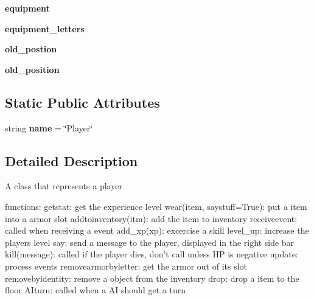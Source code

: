 \begin{DoxyCompactItemize}
\item 
\hypertarget{classplayer__input_1_1_player_object_a9ef633c704f30a24c5cdbd3718bd3533}{}{\bfseries equipment}\label{classplayer__input_1_1_player_object_a9ef633c704f30a24c5cdbd3718bd3533}

\item 
\hypertarget{classplayer__input_1_1_player_object_ae7e42b989ea422953e012e2a526c2b7b}{}{\bfseries equipment\+\_\+letters}\label{classplayer__input_1_1_player_object_ae7e42b989ea422953e012e2a526c2b7b}

\item 
\hypertarget{classplayer__input_1_1_player_object_a3a86c0496044c578bbfebb2f376f97d0}{}{\bfseries old\+\_\+postion}\label{classplayer__input_1_1_player_object_a3a86c0496044c578bbfebb2f376f97d0}

\item 
\hypertarget{classplayer__input_1_1_player_object_a061ef0101854a1d8915da9a9aaa05b81}{}{\bfseries old\+\_\+position}\label{classplayer__input_1_1_player_object_a061ef0101854a1d8915da9a9aaa05b81}

\end{DoxyCompactItemize}
\subsection*{Static Public Attributes}
\begin{DoxyCompactItemize}
\item 
\hypertarget{classplayer__input_1_1_player_object_a9250b79ae03cce6da884d59edd276a6b}{}string {\bfseries name} = \char`\"{}Player\char`\"{}\label{classplayer__input_1_1_player_object_a9250b79ae03cce6da884d59edd276a6b}

\end{DoxyCompactItemize}


\subsection{Detailed Description}
\begin{DoxyVerb}A class that represents a player

functions:
getstat: get the experience level
wear(item, saystuff=True): put a item into a armor slot
addtoinventory(itm): add the item to inventory
receiveevent: called when receiving a event
add_xp(xp): excercise a skill
level_up: increase the players level
say: send a message to the player, displayed in the right side bar
kill(message): called if the player dies, don't call unless HP is negative
update: process events
removearmorbyletter: get the armor out of its slot
removebyidentity: remove a object from the inventory
drop: drop a item to the floor
AIturn: called when a AI should get a turn
\end{DoxyVerb}
 

